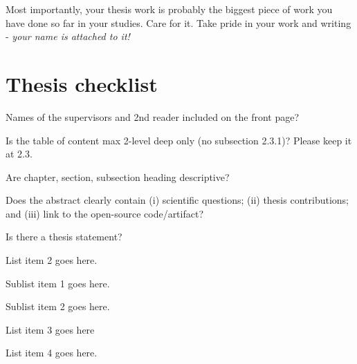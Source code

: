Most importantly, your thesis work is probably the biggest piece of work you have done so far in your studies. 
Care for it. Take pride in your work and writing - \textit{your name is attached to it!} 


\newpage 
\section*{Thesis checklist}
  \begin{todolist}
    \item Names of the supervisors and 2nd reader included on the front page?   
    \item Is the table of content max 2-level deep only (no subsection 2.3.1)? Please keep it at 2.3. 
    \item Are chapter, section, subsection heading descriptive?
    \item Does the abstract clearly contain (i) scientific questions; (ii) thesis contributions; and (iii) link to the open-source code/artifact?
    \item Is there a thesis statement? 
    \item List item 2 goes here.
    \begin{todolist}
      \item Sublist item 1 goes here.
      \item Sublist item 2 goes here.
    \end{todolist}
    \item List item 3 goes here
    \item List item 4 goes here.
  \end{todolist}
